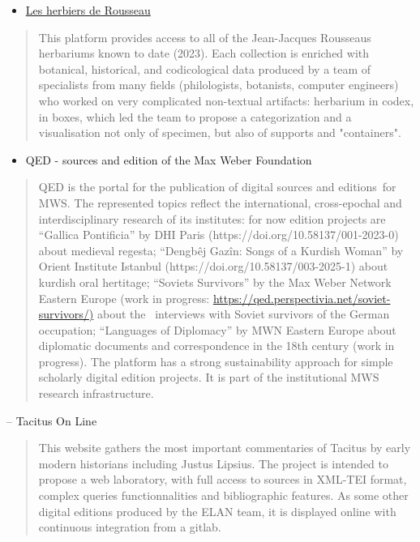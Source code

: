 \documentclass[
  letterpaper,
  DIV=11,
  numbers=noendperiod]{scrreprt}
\providecommand{\tightlist}{%
  \setlength{\itemsep}{0pt}\setlength{\parskip}{0pt}}\usepackage{longtable,booktabs,array}
\begin{document}
\begin{itemize}
\tightlist
\item
  \href{https://lesherbiersderousseau.org/}{Les herbiers de Rousseau}
\end{itemize}

\begin{quote}
This platform provides access to all of the Jean-Jacques
Rousseau\textquotesingle s herbariums known to date (2023). Each
collection is enriched with botanical, historical, and codicological
data produced by a team of specialists from many fields (philologists,
botanists, computer engineers) who worked on very complicated
non-textual artifacts: herbarium in codex, in boxes, which led the team
to propose a categorization and a visualisation not only of specimen,
but also of supports and "containers".
\end{quote}

\begin{itemize}
\tightlist
\item
  QED - sources and edition of the Max Weber Foundation
\end{itemize}

\begin{quote}
QED is the portal for the publication of digital sources and
editions~for MWS. The represented topics reflect the international,
cross-epochal and interdisciplinary research of its institutes: for now
edition projects are ``Gallica Pontificia'' by DHI Paris
(https://doi.org/10.58137/001-2023-0) about medieval regesta; ``Dengbêj
Gazîn: Songs of a Kurdish Woman'' by Orient Institute Istanbul
(https://doi.org/10.58137/003-2025-1) about kurdish oral hertitage;
``Soviets Survivors'' by the Max Weber Network Eastern Europe (work in
progress: \url{https://qed.perspectivia.net/soviet-survivors/)} about
the ~interviews with Soviet survivors of the German occupation;
``Languages of Diplomacy'' by MWN Eastern Europe about diplomatic
documents and correspondence in the 18th century (work in progress). The
platform has a strong sustainability approach for simple scholarly
digital edition projects. It is part of the institutional MWS research
infrastructure.
\end{quote}

-- Tacitus On Line

\begin{quote}
This website gathers the most important commentaries of Tacitus by early
modern historians including Justus Lipsius. The project is intended to
propose a web laboratory, with full access to sources in XML-TEI format,
complex queries functionnalities and bibliographic features. As some
other digital editions produced by the ELAN team, it is displayed online
with continuous integration from a gitlab.
\end{quote}
\end{document}
